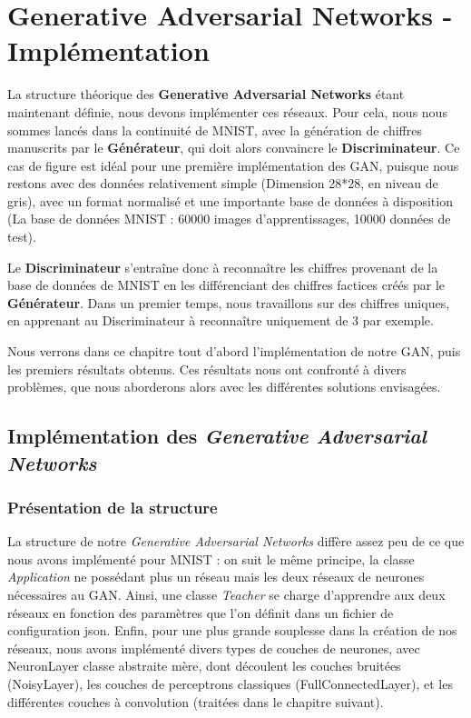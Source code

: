 \chapter{Generative Adversarial Networks - Implémentation}

 La structure théorique des \textbf{Generative Adversarial Networks} étant maintenant définie, nous devons implémenter ces réseaux. Pour cela, nous nous sommes lancés dans la continuité de MNIST, avec la génération de chiffres manuscrits par le \textbf{Générateur}, qui doit alors convaincre le \textbf{Discriminateur}. Ce cas de figure est idéal pour une première implémentation des GAN, puisque nous restons avec des données relativement simple (Dimension 28*28, en niveau de gris), avec un format normalisé et une importante base de données à disposition (La base de données MNIST : 60000 images d'apprentissages, 10000 données de test).

Le \textbf{Discriminateur} s’entraîne donc à reconnaître les chiffres provenant de la base de données de MNIST en les différenciant des chiffres factices créés par le \textbf{Générateur}. Dans un premier temps, nous travaillons sur des chiffres uniques, en apprenant au Discriminateur à reconnaître uniquement de 3 par exemple.

Nous verrons dans ce chapitre tout d'abord l'implémentation de notre GAN, puis les premiers résultats obtenus. Ces résultats nous ont confronté à divers problèmes, que nous aborderons alors avec les différentes solutions envisagées.


\section{Implémentation des \textit{Generative Adversarial Networks}}
\subsection{Présentation de la structure}

La structure de notre \textit{Generative Adversarial Networks} diffère assez peu de ce que nous avons implémenté pour MNIST : on suit le même principe, la classe \textit{Application} ne possédant plus un réseau mais les deux réseaux de neurones nécessaires au GAN. 
Ainsi, une classe \textit{Teacher} se charge d'apprendre aux deux réseaux en fonction des paramètres que l'on définit dans un fichier de configuration json. Enfin, pour une plus grande souplesse dans la création de nos réseaux, nous avons implémenté divers types de couches de neurones, avec NeuronLayer classe abstraite mère, dont découlent les couches bruitées (NoisyLayer), les couches de perceptrons classiques (FullConnectedLayer), et les différentes couches à convolution (traitées dans le chapitre suivant).

